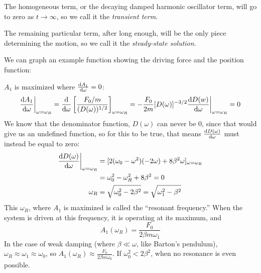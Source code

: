 \documentclass[a4paper]{article}
\begin{document}
The homogeneous term, or the decaying damped harmonic oscillator term, will
go to zero as $t\to\infty$, so we call it the \emph{transient term}.

The remaining particular term, after long enough, will be the only piece
determining the motion, so we call it the \emph{steady-state solution}.

We can graph an example function showing the driving force and the position
function:
\begin{center}
\end{center}

$A_1$ is maximized where $\frac{\mathrm{d} A_1}{\mathrm{d} \omega} = 0$:
\begin{align*}
	\frac{\mathrm{d} A_1}{\mathrm{d} \omega}\bigg\rvert_{\omega=\omega_R} = \frac{\mathrm{d} }{\mathrm{d} \omega}\left[
	\frac{F_0/m}{(D(\omega))^{1/2}}\right]_{\omega=\omega_R}
	= -\frac{F_0}{2m}[D(\omega)]^{-3/2}\frac{\mathrm{d} D(w)}{\mathrm{d} \omega}\bigg\rvert_{
	\omega=\omega_R} = 0
\end{align*}
We know that the denominator function, $D(\omega)$ can never be 0, since that
would give us an undefined function, so for this to be true, that means
$\frac{\mathrm{d} D(\omega)}{\mathrm{d} \omega}$ must instead be equal to zero:
\begin{align*}
	\frac{\mathrm{d} D(\omega)}{\mathrm{d} \omega}\bigg\rvert_{\omega=\omega_R}
	&= [2(\omega_0-\omega^2)(-2\omega)+8\beta^2\omega]_{\omega=\omega_R}\\
	&= \omega_0^2-\omega_R^2+8\beta^2 = 0\\
	\omega_R &= \sqrt{\omega_0^2-2\beta^2} = \sqrt{\omega_1^2-\beta^2}
\end{align*}
This $\omega_R$, where $A_1$ is maximized is called the ``resonant frequency.''
When the system is driven at this frequency, it is operating at its maximum,
and
\[ A_1(\omega_R) = \frac{F_0}{2\beta m\omega_1} \]
In the case of weak damping (where $\beta \ll \omega$, like Barton's pendulum),
$\omega_R \approx \omega_1 \approx \omega_0$, so \(A_1(\omega_R) \approx
\frac{F_0}{2\beta m\omega_0}\). If $\omega_0^2<2\beta^2$, when no resonance
is even possible.
\end{document}
